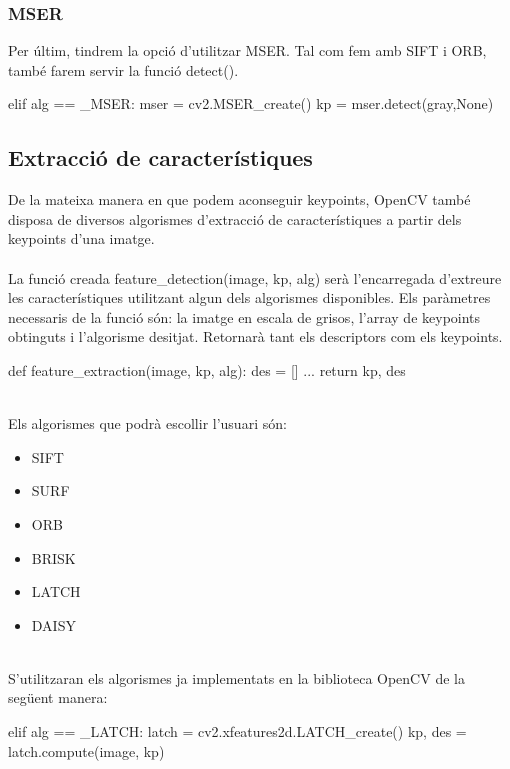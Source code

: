 		\subsubsection{MSER}
		Per últim, tindrem la opció d'utilitzar MSER. Tal com fem amb SIFT i ORB, també farem servir la funció detect().\\
		\begin{python}
	elif alg == _MSER:
		mser = cv2.MSER_create()
		kp = mser.detect(gray,None)
		\end{python}
\newpage
	\subsection{Extracció de característiques}
		De la mateixa manera en que podem aconseguir keypoints, OpenCV també disposa de diversos algorismes d'extracció de característiques a partir dels keypoints d'una imatge.\\\\
		La funció creada feature{\_}detection(image, kp, alg) serà l'encarregada d'extreure les característiques utilitzant algun dels algorismes disponibles. Els paràmetres necessaris de la funció són:
		la imatge en escala de grisos, l'array de keypoints obtinguts i l'algorisme desitjat. Retornarà tant els descriptors com els keypoints.\\

		\begin{python}
def feature_extraction(image, kp, alg):
	des = []
	...
	return kp, des
		\end{python}
		\ \\Els algorismes que podrà escollir l'usuari són:
		\begin{itemize}
			\item{SIFT}
			\item{SURF}
			\item{ORB}
			\item{BRISK}
			\item{LATCH}
			\item{DAISY}
		\end{itemize}
	\ \\S'utilitzaran els algorismes ja implementats en la biblioteca OpenCV de la següent manera:\\

		\begin{python}
	elif alg == _LATCH:
		latch = cv2.xfeatures2d.LATCH_create()
		kp, des = latch.compute(image, kp)
		\end{python}


